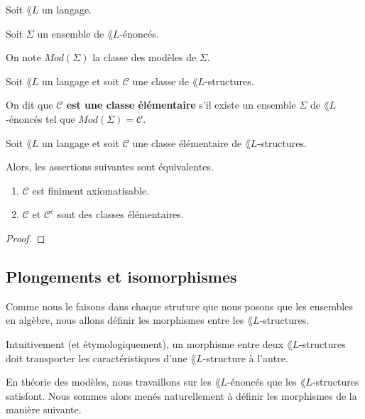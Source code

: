 \documentclass[a4paper, 12pt]{report}
\begin{document}
\begin{definition} 
	Soit $\lang{L}$ un langage.

	Soit $\Sigma$ un ensemble de $\lang{L}$-énoncés.

	On note $Mod(\Sigma)$ la classe des modèles de $\Sigma$.
\end{definition}

\begin{definition} 
	Soit $\lang{L}$ un langage et soit $\mathcal{C}$ une classe de $\lang{L}$-structures.

	On dit que \textbf{$\mathcal{C}$ est une classe élémentaire} s'il existe un
	ensemble $\Sigma$ de $\lang{L}$-énoncés tel que $Mod(\Sigma) = \mathcal{C}$.
\end{definition}

\begin{proposition}
	Soit $\lang{L}$ un langage et soit $\mathcal{C}$ une classe élémentaire de
	$\lang{L}$-structures.

	Alors, les assertions suivantes sont équivalentes.

	\begin{enumerate}
		\item $\mathcal{C}$ est finiment axiomatisable.
		\item $\mathcal{C}$ et $\mathcal{C}^{c}$ sont des classes élémentaires.
	\end{enumerate}
\end{proposition}

\ifdefined\outputproof
\begin{proof}

\end{proof}
\fi

\subsection{Plongements et isomorphismes}

Comme nous le faisons dans chaque struture que nous posons que les ensembles en
algèbre, nous allons définir les morphismes entre les $\lang{L}$-structures.

Intuitivement (et étymologiquement), un morphisme entre deux
$\lang{L}$-structures doit transporter les caractéristiques d'une
$\lang{L}$-structure à l'autre.

En théorie des modèles, nous travaillons sur les $\lang{L}$-énoncés que les
$\lang{L}$-structures satisfont. Nous sommes alors menés naturellement à définir
les morphismes de la manière suivante.
\end{document}
